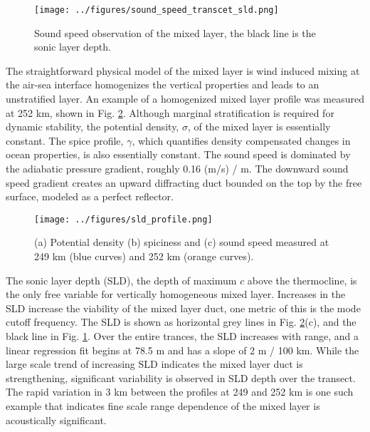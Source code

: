 \documentclass[preprint,NumberedRefs]{JASA}
\begin{document}
\begin{figure}
\texttt{[image: ../figures/sound\_speed\_transcet\_sld.png]}
\caption{\label{fig:c_grid}{Sound speed observation of the mixed layer, the black line is the sonic layer depth.}}
\end{figure}

The straightforward physical model of the mixed layer is wind induced mixing at the air-sea interface homogenizes the vertical properties and leads to an unstratified layer. An example of a homogenized mixed layer profile was measured at 252 km, shown in Fig. \ref{fig:profiles}. Although marginal stratification is required for dynamic stability, the potential density, $\sigma$, of the mixed layer is essentially constant. The spice profile, $\gamma$, which quantifies density compensated changes in ocean properties, is also essentially constant. The sound speed is dominated by the adiabatic pressure gradient, roughly 0.16 (m/s) / m. The downward sound speed gradient creates an upward diffracting duct bounded on the top by the free surface, modeled as a perfect reflector.

\begin{figure}
\texttt{[image: ../figures/sld\_profile.png]}
    \caption{\label{fig:profiles}{(a) Potential density (b) spiciness and (c) sound speed measured at 249 km (blue curves) and 252 km (orange curves).}}
\end{figure}

The sonic layer depth (SLD), the depth of maximum $c$ above the thermocline, is the only free variable for vertically homogeneous mixed layer. Increases in the SLD increase the viability of the mixed layer duct, one metric of this is the mode cutoff frequency. The SLD is shown as horizontal grey lines in Fig. \ref{fig:profiles}(c), and the black line in Fig. \ref{fig:c_grid}. Over the entire trances, the SLD increases with range, and a linear regression fit begins at 78.5 m and has a slope of 2 m / 100 km. While the large scale trend of increasing SLD indicates the mixed layer duct is strengthening, significant variability is observed in SLD depth over the transect. The rapid variation in 3 km between the profiles at 249 and 252 km is one such example that indicates fine scale range dependence of the mixed layer is acoustically significant.
\end{document}
